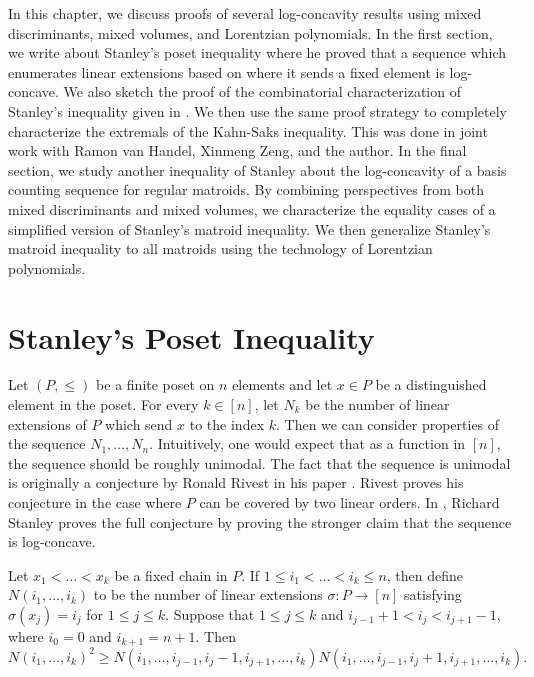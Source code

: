 \documentclass{puthesis-UG}
\begin{document}
In this chapter, we discuss proofs of several log-concavity results using mixed discriminants, mixed volumes, and Lorentzian polynomials. In the first section, we write about Stanley's poset inequality where he proved that a sequence which enumerates linear extensions based on where it sends a fixed element is log-concave. We also sketch the proof of the combinatorial characterization of Stanley's inequality given in \cite{shenfeld2022extremals}. We then use the same proof strategy to completely characterize the extremals of the Kahn-Saks inequality. This was done in joint work with Ramon van Handel, Xinmeng Zeng, and the author. In the final section, we study another inequality of Stanley about the log-concavity of a basis counting sequence for regular matroids. By combining perspectives from both mixed discriminants and mixed volumes, we characterize the equality cases of a simplified version of Stanley's matroid inequality. We then generalize Stanley's matroid inequality to all matroids using the technology of Lorentzian polynomials. 

\section{Stanley's Poset Inequality} \label{stanley-poset-inequality}

Let $(P, \leq)$ be a finite poset on $n$ elements and let $x \in P$ be a distinguished element in the poset. For every $k \in [n]$, let $N_k$ be the number of linear extensions of $P$ which send $x$ to the index $k$. Then we can consider properties of the sequence $N_1, \ldots, N_n$. Intuitively, one would expect that as a function in $[n]$, the sequence should be roughly unimodal. The fact that the sequence is unimodal is originally a conjecture by Ronald Rivest in his paper \cite{stanley-poset-inequality-origin}. Rivest proves his conjecture in the case where $P$ can be covered by two linear orders. In \cite{STANLEY}, Richard Stanley proves the full conjecture by proving the stronger claim that the sequence is log-concave.

\begin{thm} \label{stanley-poset-inequality-general-case}
	Let $x_1 < \ldots < x_k$ be a fixed chain in $P$. If $1 \leq i_1 < \ldots < i_k \leq n$, then define $N(i_1, \ldots, i_k)$ to be the number of linear extensions $\sigma : P \to [n]$ satisfying $\sigma (x_j) = i_j$ for $1 \leq j \leq k$. Suppose that $1 \leq j \leq k$ and $i_{j-1} + 1 < i_j < i_{j+1} - 1$, where $i_0 = 0$ and $i_{k+1} = n+1$. Then 
	\[
		N(i_1, \ldots, i_k)^2 \geq N(i_1, \ldots, i_{j-1}, i_j - 1, i_{j+1}, \ldots, i_k) N(i_1, \ldots, i_{j-1}, i_j + 1, i_{j+1}, \ldots, i_k).
	\]
\end{thm}
\end{document}
